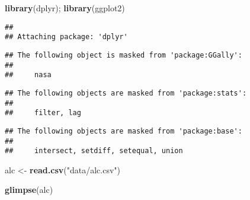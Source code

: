 \documentclass[]{article}
\newenvironment{Shaded}{\begin{snugshade}}{\end{snugshade}}
\newcommand{\KeywordTok}[1]{\textcolor[rgb]{0.13,0.29,0.53}{\textbf{#1}}}
\newcommand{\StringTok}[1]{\textcolor[rgb]{0.31,0.60,0.02}{#1}}
\newcommand{\NormalTok}[1]{#1}
\begin{document}
\begin{Shaded}
\begin{Highlighting}[]
\KeywordTok{library}\NormalTok{(dplyr); }\KeywordTok{library}\NormalTok{(ggplot2)}
\end{Highlighting}
\end{Shaded}

\begin{verbatim}
## 
## Attaching package: 'dplyr'
\end{verbatim}

\begin{verbatim}
## The following object is masked from 'package:GGally':
## 
##     nasa
\end{verbatim}

\begin{verbatim}
## The following objects are masked from 'package:stats':
## 
##     filter, lag
\end{verbatim}

\begin{verbatim}
## The following objects are masked from 'package:base':
## 
##     intersect, setdiff, setequal, union
\end{verbatim}

\begin{Shaded}
\begin{Highlighting}[]
\NormalTok{alc <-}\StringTok{ }\KeywordTok{read.csv}\NormalTok{(}\StringTok{"data/alc.csv"}\NormalTok{)}

\KeywordTok{glimpse}\NormalTok{(alc)}
\end{Highlighting}
\end{Shaded}
\end{document}
